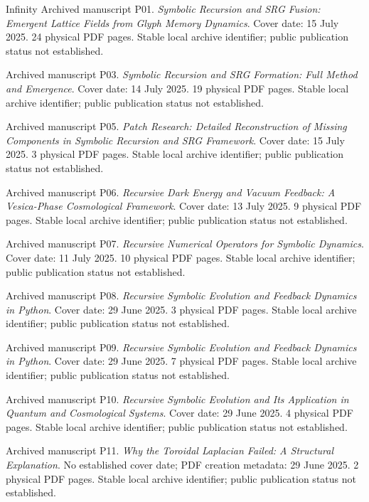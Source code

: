 \documentclass[11pt,a4paper]{article}
\theoremstyle{definition}
\numberwithin{equation}{section}
\begin{document}
\begin{thebibliography}{Infinity}
\small
{}
Archived manuscript P01.
\emph{Symbolic Recursion and SRG Fusion: Emergent Lattice Fields from Glyph Memory Dynamics}.
Cover date: 15 July 2025. 24 physical PDF pages.
Stable local archive identifier; public publication status not established.

Archived manuscript P03.
\emph{Symbolic Recursion and SRG Formation: Full Method and Emergence}.
Cover date: 14 July 2025. 19 physical PDF pages.
Stable local archive identifier; public publication status not established.

Archived manuscript P05.
\emph{Patch Research: Detailed Reconstruction of Missing Components in Symbolic Recursion and SRG Framework}.
Cover date: 15 July 2025. 3 physical PDF pages.
Stable local archive identifier; public publication status not established.

Archived manuscript P06.
\emph{Recursive Dark Energy and Vacuum Feedback: A Vesica-Phase Cosmological Framework}.
Cover date: 13 July 2025. 9 physical PDF pages.
Stable local archive identifier; public publication status not established.

Archived manuscript P07.
\emph{Recursive Numerical Operators for Symbolic Dynamics}.
Cover date: 11 July 2025. 10 physical PDF pages.
Stable local archive identifier; public publication status not established.

Archived manuscript P08.
\emph{Recursive Symbolic Evolution and Feedback Dynamics in Python}.
Cover date: 29 June 2025. 3 physical PDF pages.
Stable local archive identifier; public publication status not established.

Archived manuscript P09.
\emph{Recursive Symbolic Evolution and Feedback Dynamics in Python}.
Cover date: 29 June 2025. 7 physical PDF pages.
Stable local archive identifier; public publication status not established.

Archived manuscript P10.
\emph{Recursive Symbolic Evolution and Its Application in Quantum and Cosmological Systems}.
Cover date: 29 June 2025. 4 physical PDF pages.
Stable local archive identifier; public publication status not established.

Archived manuscript P11.
\emph{Why the Toroidal Laplacian Failed: A Structural Explanation}.
No established cover date; PDF creation metadata: 29 June 2025. 2 physical PDF pages.
Stable local archive identifier; public publication status not established.


\end{thebibliography}
\end{document}
